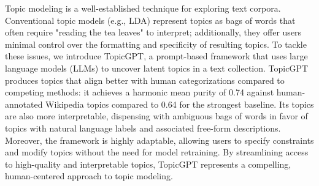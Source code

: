 Topic modeling is a well-established technique for exploring text corpora. Conventional topic models (e.g., LDA) represent topics as bags of words that often require "reading the tea leaves" to interpret; additionally, they offer users minimal control over the formatting and specificity of resulting topics. To tackle these issues, we introduce TopicGPT, a prompt-based framework that uses large language models (LLMs) to uncover latent topics in a text collection. TopicGPT produces topics that align better with human categorizations compared to competing methods: it achieves a harmonic mean purity of 0.74 against human-annotated Wikipedia topics compared to 0.64 for the strongest baseline. Its topics are also more interpretable, dispensing with ambiguous bags of words in favor of topics with natural language labels and associated free-form descriptions. Moreover, the framework is highly adaptable, allowing users to specify constraints and modify topics without the need for model retraining. By streamlining access to high-quality and interpretable topics, TopicGPT represents a compelling, human-centered approach to topic modeling.
